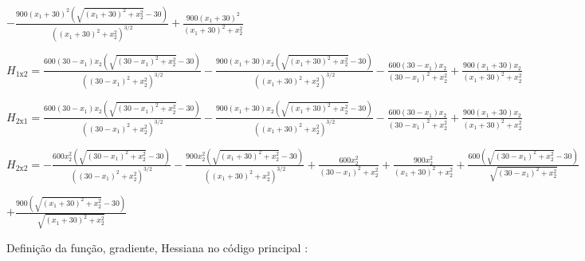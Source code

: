 \documentclass[10pt, a4paper]{article}
\begin{document}
\hspace{3em}
$-\frac{900 (x_1 + 30)^2 (\sqrt{(x_1 + 30)^2 + x_2^2} - 30)}{((x_1 + 30)^2 + x_2^2)^{3/2}} +
\frac{900 (x_1 + 30)^2}{(x_1 + 30)^2 + x_2^2}$

\vspace{5mm}

$H_{1\text{x}2} = \frac{600 (30 - x_1) x_2 (\sqrt{(30 - x_1)^2 + x_2^2} - 30)}{((30 - x_1)^2 + x_2^2)^{3/2}} -
\frac{900 (x_1 + 30) x_2 (\sqrt{(x_1 + 30)^2 + x_2^2} - 30)}{((x_1 + 30)^2 + x_2^2)^{3/2}} -
\frac{600 (30 - x_1) x_2}{(30 - x_1)^2 + x_2^2} +
\frac{900 (x_1 + 30) x_2}{(x_1 + 30)^2 + x_2^2}$

\vspace{5mm}

$H_{2\text{x}1} = \frac{600 (30 - x_1) x_2 (\sqrt{(30 - x_1)^2 + x_2^2} - 30)}{((30 - x_1)^2 + x_2^2)^{3/2}} -
\frac{900 (x_1 + 30) x_2 (\sqrt{(x_1 + 30)^2 + x_2^2} - 30)}{((x_1 + 30)^2 + x_2^2)^{3/2}} -
\frac{600 (30 - x_1) x_2}{(30 - x_1)^2 + x_2^2} +
\frac{900 (x_1 + 30) x_2}{(x_1 + 30)^2 + x_2^2}$

\vspace{5mm}

$H_{2\text{x}2} = -\frac{600 x_2^2 (\sqrt{(30 - x_1)^2 + x_2^2} - 30)}{((30 - x_1)^2 + x_2^2)^{3/2}} -
\frac{900 x_2^2 (\sqrt{(x_1 + 30)^2 + x_2^2} - 30)}{((x_1 + 30)^2 + x_2^2)^{3/2}} +
\frac{600 x_2^2}{(30 - x_1)^2 + x_2^2} +
\frac{900 x_2^2}{(x_1 + 30)^2 + x_2^2} +
\frac{600 (\sqrt{(30 - x_1)^2 + x_2^2} - 30)}{\sqrt{(30 - x_1)^2 + x_2^2}}$

\hspace{3em}
$+\frac{900 (\sqrt{(x_1 + 30)^2 + x_2^2} - 30)}{\sqrt{(x_1 + 30)^2 + x_2^2}}$

\vspace{5mm}
Definição da função, gradiente, Hessiana no código principal :
\end{document}
